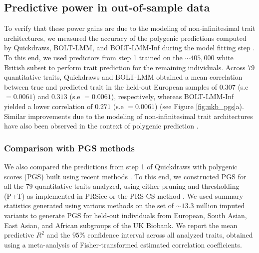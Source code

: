 \clearpage

\subsection{Predictive power in out-of-sample data}
\label{sec:ch5-qd-pgs}

To verify that these power gains are due to the modeling of non-infinitesimal trait architectures, we measured the accuracy of the polygenic predictions computed by Quickdraws, BOLT-LMM, and BOLT-LMM-Inf during the model fitting step \cite{loh2015efficient,loh2018mixed}.
%
To this end, we used predictors from step 1 trained on the ${\sim}405{,}000$ white British subset to perform trait prediction for the remaining individuals.
%
Across $79$ quantitative traits, Quickdraws and BOLT-LMM obtained a mean correlation between true and predicted trait in the held-out European samples of $0.307$ (s.e $= 0.0061$) and $0.313$ (s.e $= 0.0061$), respectively, whereas BOLT-LMM-Inf yielded a lower correlation of $0.271$ (s.e $= 0.0061$) (see Figure \ref{fig:ukb_pgs}a).
%
Similar improvements due to the modeling of non-infinitesimal trait architectures have also been observed in the context of polygenic prediction \cite{vilhjalmsson2015modeling,loh2015efficient,loh2018mixed,lloyd2019improved,prive2020ldpred2}.
%

\subsubsection{Comparison with PGS methods}

We also compared the predictions from step 1 of Quickdraws with polygenic scores (PGS) built using recent methods \cite{euesden2015prsice, ge2019polygenic}.
%
To this end, we constructed PGS for all the $79$ quantitative traits analyzed, using either pruning and thresholding (P+T) as implemented in PRSice \cite{euesden2015prsice} or the PRS-CS method \cite{ge2019polygenic}.
%
We used summary statistics generated using various methods on the set of ${\sim}13.3$ million imputed variants to generate PGS for held-out individuals from European, South Asian, East Asian, and African subgroups of the UK Biobank.
%
We report the mean predictive $R^2$ and the $95\%$ confidence interval across all analyzed traits, obtained using a meta-analysis of Fisher-transformed estimated correlation coefficients.

